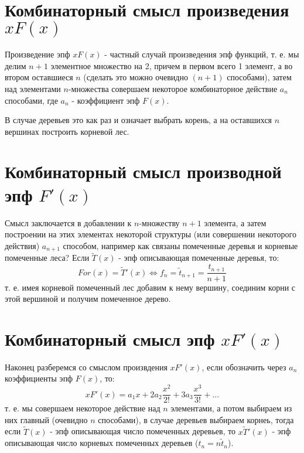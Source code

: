 \section{Комбинаторный смысл произведения $xF\left(x\right)$}

Произведение эпф $xF\left(x\right)$ - частный случай произведения эпф функций, т. е. мы делим $n+1$ элементное множество на 2, причем в первом всего 1 элемент, а во втором оставшиеся $n$ (сделать это можно очевидно $\left(n+1\right)$ способами), затем над элементами $n$-множества совершаем некоторое комбинаторное действие $a_n$ способами, где $a_n$ - коэффициент эпф $F\left(x\right)$.

В случае деревьев это как раз и означает выбрать корень, а на оставшихся $n$ вершинах построить корневой лес.

\section{Комбинаторный смысл производной эпф $F'\left(x\right)$}

Смысл заключается в добавлении к $n$-множеству $n+1$ элемента, а затем построении на этих элементах некоторой структуры (или совершении некоторого действия) $a_{n+1}$ способом, например как связаны помеченные деревья и корневые помеченные леса? Если $\tilde T\left(x\right)$ - эпф описывающая помеченные деревья, то:
\begin{equation}
	For\left(x\right) = \tilde T'\left(x\right) \Leftrightarrow f_n = \tilde t_{n+1} = \frac{t_{n+1}}{n+1}
\end{equation}
т. е. имея корневой помеченный лес добавим к нему вершину, соединим корни с этой вершиной и получим помеченное дерево.

\section{Комбинаторный смысл эпф $xF'\left(x\right)$}

Наконец разберемся со смыслом произвдения $xF'\left(x\right)$, если обозначить через $a_n$ коэффициенты эпф $F\left(x\right)$, то:
\[
	xF'\left(x\right) = a_1x + 2a_2\frac{x^2}{2!} + 3a_3\frac{x^3}{3!} + ...
\]
т. е. мы совершаем некоторое действие над $n$ элементами, а потом выбираем из них главный (очевидно $n$ способами), в случае деревьев выбираем корнеь, тогда если $\tilde T\left(x\right)$ - эпф описывающая число помеченных деревьев, то $x \tilde T'\left(x\right)$ - эпф описывающая число корневых помеченных деревьев ($t_n = n \tilde t_n$).
